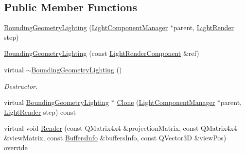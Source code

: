 \subsection*{Public Member Functions}
\begin{DoxyCompactItemize}
\item 
\mbox{\hyperlink{class_geometry_engine_1_1_light_utils_1_1_bounding_geometry_lighting_a9b7363be5820b70f03828a4704fe448d}{Bounding\+Geometry\+Lighting}} (\mbox{\hyperlink{class_geometry_engine_1_1_light_utils_1_1_light_component_manager}{Light\+Component\+Manager}} $\ast$parent, \mbox{\hyperlink{namespace_geometry_engine_1_1_light_utils_ac3078de660742daceaa06bd9bc61d24a}{Light\+Render}} step)
\item 
\mbox{\hyperlink{class_geometry_engine_1_1_light_utils_1_1_bounding_geometry_lighting_aba6240594290eef979a9313a55eb9e3f}{Bounding\+Geometry\+Lighting}} (const \mbox{\hyperlink{class_geometry_engine_1_1_light_utils_1_1_light_render_component}{Light\+Render\+Component}} \&ref)
\item 
\mbox{\label{class_geometry_engine_1_1_light_utils_1_1_bounding_geometry_lighting_ab2fd445874bdee65c82b44431e58c4bb}} 
virtual \mbox{\hyperlink{class_geometry_engine_1_1_light_utils_1_1_bounding_geometry_lighting_ab2fd445874bdee65c82b44431e58c4bb}{$\sim$\+Bounding\+Geometry\+Lighting}} ()
\begin{DoxyCompactList}\small\item\em Destructor. \end{DoxyCompactList}\item 
virtual \mbox{\hyperlink{class_geometry_engine_1_1_light_utils_1_1_bounding_geometry_lighting}{Bounding\+Geometry\+Lighting}} $\ast$ \mbox{\hyperlink{class_geometry_engine_1_1_light_utils_1_1_bounding_geometry_lighting_af28cdecb60e4230898099d85245fb5c8}{Clone}} (\mbox{\hyperlink{class_geometry_engine_1_1_light_utils_1_1_light_component_manager}{Light\+Component\+Manager}} $\ast$parent, \mbox{\hyperlink{namespace_geometry_engine_1_1_light_utils_ac3078de660742daceaa06bd9bc61d24a}{Light\+Render}} step) const
\item 
virtual void \mbox{\hyperlink{class_geometry_engine_1_1_light_utils_1_1_bounding_geometry_lighting_a604f7fea25829abe9106f929eb2b142f}{Render}} (const Q\+Matrix4x4 \&projection\+Matrix, const Q\+Matrix4x4 \&view\+Matrix, const \mbox{\hyperlink{class_geometry_engine_1_1_buffers_info}{Buffers\+Info}} \&buffers\+Info, const Q\+Vector3D \&view\+Pos) override
\end{DoxyCompactItemize}
